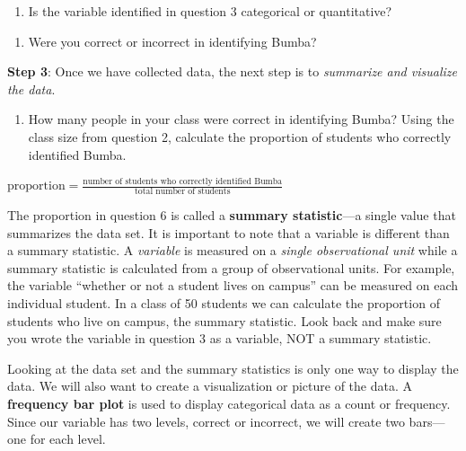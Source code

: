 \documentclass[
]{report}
\providecommand{\tightlist}{%
  \setlength{\itemsep}{0pt}\setlength{\parskip}{0pt}}
\begin{document}
\begin{enumerate}
\def\labelenumi{\arabic{enumi}.}
\setcounter{enumi}{3}
\tightlist
\item
  Is the variable identified in question 3 categorical or quantitative?
\end{enumerate}

\vspace{0.3in}

\begin{enumerate}
\def\labelenumi{\arabic{enumi}.}
\setcounter{enumi}{4}
\tightlist
\item
  Were you correct or incorrect in identifying Bumba?
\end{enumerate}

\vspace{0.3in}

\newpage

\textbf{Step 3}: Once we have collected data, the next step is to \emph{summarize and visualize the data}.

\begin{enumerate}
\def\labelenumi{\arabic{enumi}.}
\setcounter{enumi}{5}
\tightlist
\item
  How many people in your class were correct in identifying Bumba? Using the class size from question 2, calculate the proportion of students who correctly identified Bumba.
\end{enumerate}

\begin{center}
$\mbox{proportion} = \frac{\mbox{number of students who correctly identified Bumba}}{\mbox{total number of students}}$
\end{center}

\vspace{0.7in}

The proportion in question 6 is called a \textbf{summary statistic}---a single value that summarizes the data set. It is important to note that a variable is different than a summary statistic. A \emph{variable} is measured on a \emph{single observational unit} while a summary statistic is calculated from a group of observational units. For example, the variable ``whether or not a student lives on campus'' can be measured on each individual student. In a class of 50 students we can calculate the proportion of students who live on campus, the summary statistic. Look back and make sure you wrote the variable in question 3 as a variable, NOT a summary statistic.

Looking at the data set and the summary statistics is only one way to display the data. We will also want to create a visualization or picture of the data. A \textbf{frequency bar plot} is used to display categorical data as a count or frequency. Since our variable has two levels, correct or incorrect, we will create two bars---one for each level.
\end{document}
